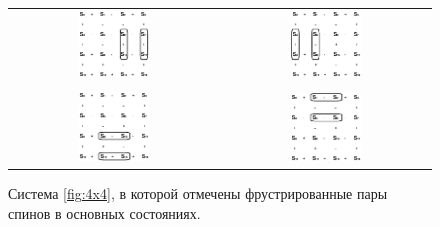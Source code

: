 \documentclass[utf8, babel, sor, jor, amsmath, amssymb, reprint]{elsarticle} %
\begin{document}
\begin{figure}[htbp]
	\centering
	\begin{tabular}{cc}
		\includegraphics[width=0.35\textwidth]{Cl1_Type2_gs1.eps} & \hspace{0.05\textwidth}
		\includegraphics[width=0.35\textwidth]{Cl1_Type2_gs2.eps} \\ %
		\vspace{0.5cm} \\
		\includegraphics[width=0.35\textwidth]{Cl1_Type2_gs3.eps} & \hspace{0.05\textwidth}
		\includegraphics[width=0.35\textwidth]{Cl1_Type2_gs4.eps} \\ %
	\end{tabular}
	\caption{Система \ref{fig:4x4}, в которой отмечены фрустрированные пары спинов в основных состояниях.}
\label{fig:4x4.1}
\end{figure}
\end{document}
